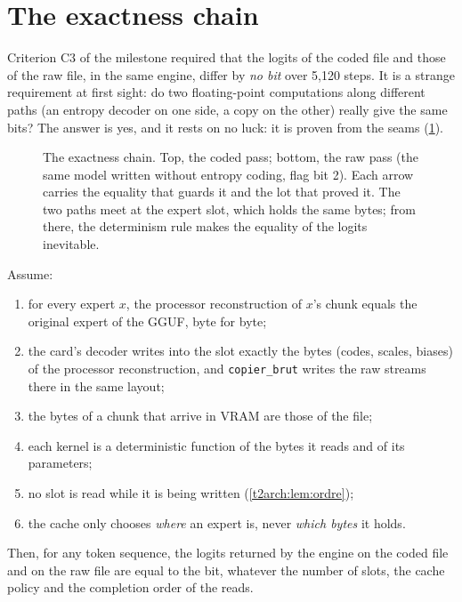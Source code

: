 \section{The exactness chain}\label{t2arch:sec:chaine}

Criterion C3 of the milestone required that the logits of the coded file and those of the raw file, in the same engine, differ by \emph{no bit} over 5{,}120 steps. It is a strange requirement at first sight: do two floating-point computations along different paths (an entropy decoder on one side, a copy on the other) really give the same bits? The answer is yes, and it rests on no luck: it is proven from the seams (\cref{t2arch:fig:chaine}).

\begin{figure}[ht]
\centering
\TdArchChaine
\caption[The exactness chain]{The exactness chain. Top, the coded pass; bottom, the raw pass (the same model written without entropy coding, flag bit 2). Each arrow carries the equality that guards it and the lot that proved it. The two paths meet at the expert slot, which holds the same bytes; from there, the determinism rule makes the equality of the logits inevitable.}
\label{t2arch:fig:chaine}
\end{figure}

\begin{theoreme}\label{t2arch:thm:chaine}
Assume:
\begin{enumerate}
\item[(C1)] for every expert $x$, the processor reconstruction of $x$'s chunk equals the original expert of the GGUF, byte for byte;
\item[(K1)] the card's decoder writes into the slot exactly the bytes (codes, scales, biases) of the processor reconstruction, and \texttt{copier\_brut} writes the raw streams there in the same layout;
\item[(C2)] the bytes of a chunk that arrive in VRAM are those of the file;
\item[(N)] each kernel is a deterministic function of the bytes it reads and of its parameters;
\item[(L)] no slot is read while it is being written (\cref{t2arch:lem:ordre});
\item[(A)] the cache only chooses \emph{where} an expert is, never \emph{which bytes} it holds.
\end{enumerate}
Then, for any token sequence, the logits returned by the engine on the coded file and on the raw file are equal to the bit, whatever the number of slots, the cache policy and the completion order of the reads.
\end{theoreme}

